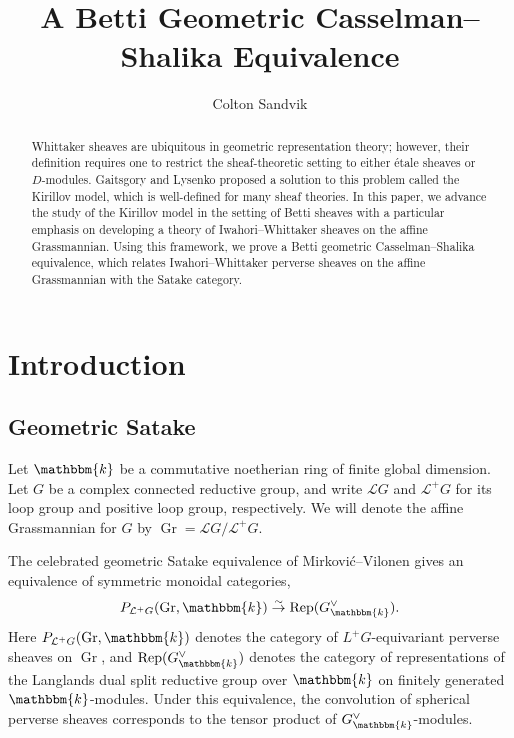 \documentclass{amsart}
\title{A Betti Geometric Casselman--Shalika Equivalence}
\author{Colton Sandvik}
\date{}
\renewcommand{\L}{\mathcal{L}}
\renewcommand{\k}{\mathbbm{k}}
\DeclareMathOperator{\Rep}{Rep}
\DeclareMathOperator{\Gr}{Gr}
\theoremstyle{definition}
\begin{document}
        \begin{abstract}
                Whittaker sheaves are ubiquitous in geometric representation theory; however, their definition requires one to restrict the sheaf-theoretic setting to either étale sheaves or $D$-modules.
                Gaitsgory and Lysenko proposed a solution to this problem called the Kirillov model, which is well-defined for many sheaf theories.
                In this paper, we advance the study of the Kirillov model in the setting of Betti sheaves with a particular emphasis on developing a theory of Iwahori--Whittaker sheaves on the affine Grassmannian.
                Using this framework, we prove a Betti geometric Casselman--Shalika equivalence, which relates Iwahori--Whittaker perverse sheaves on the affine Grassmannian with the Satake category.
        \end{abstract}

	\maketitle

    \tableofcontents

    \section{Introduction} 
        \subsection{Geometric Satake}

    Let $\k$ be a commutative noetherian ring of finite global dimension.
    Let $G$ be a complex connected reductive group, and write $\L G$ and $\L^+ G$ for its loop group and positive loop group, respectively.
    We will denote the affine Grassmannian for $G$ by $\Gr = \L G / \L^+ G$.

    The celebrated geometric Satake equivalence of Mirković--Vilonen \cite{MV} gives an equivalence of symmetric monoidal categories,
    \[ P_{\L^+ G} (\Gr, \k) \stackrel{\sim}{\to} \Rep (G_{\k}^{\vee}).\]
    Here $P_{\L^+ G} (\Gr, \k)$ denotes the category of $L^+ G$-equivariant perverse sheaves on $\Gr$, and $\Rep (G_{\k}^{\vee})$ denotes the category of representations of the Langlands dual split reductive group over $\k$ on finitely generated $\k$-modules.
    Under this equivalence, the convolution of spherical perverse sheaves corresponds to the tensor product of $G_{\k}^{\vee}$-modules.
    
\end{document}
